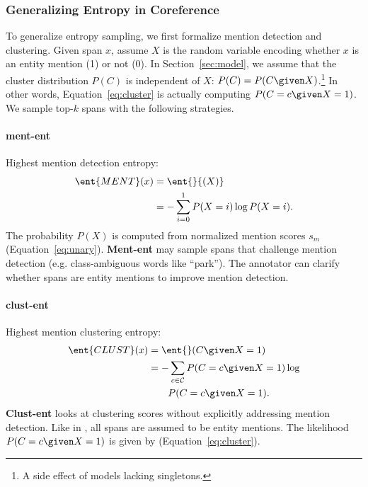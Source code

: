 \subsubsection{Generalizing Entropy in Coreference}
\label{ssec:entropy}

To generalize entropy sampling, we first formalize mention
detection and clustering. Given span $x$, assume $X$ is the random
variable encoding whether
$x$ is an entity mention (1) or not (0).
In Section~\ref{sec:model}, we assume that the cluster distribution
$P(C)$ is independent
of $X$: $P(C) = P(C \given X)$.\footnote{A side effect of \ontonotes{}
  models lacking singletons.} In other words, Equation~\ref{eq:cluster} is actually computing $P(C=c \given X=1)$.
We sample top-$k$ spans with the following strategies.

\paragraph{ment-ent} Highest mention detection entropy:
\begin{align}
    \ent{MENT}(x)
        &= \ent{}{(X)} \\
        &= - \sum_{i=0}^1 P(X=i) \log P(X=i). \nonumber
\end{align}
The probability $P(X)$ is
computed from normalized mention scores $s_m$ (Equation~\ref{eq:unary}).
\textbf{Ment-ent} may sample spans that challenge mention detection (e.g.
class-ambiguous words like ``park'').
The annotator can clarify whether spans are entity mentions to improve mention
detection.

\paragraph{clust-ent} Highest mention clustering entropy:
\begin{align}
    \ent{CLUST}(x)
        &= \ent{}(C \given X = 1) \\
        &= -\sum_{c \in \mathcal{C}} P(C = c \given X =
    1) \log \nonumber \\
    & \qquad P(C = c \given X = 1). \nonumber
\end{align}
\textbf{Clust-ent} looks at clustering scores
without explicitly addressing mention detection.
Like in \ontonotes{}, all spans are assumed to be entity mentions.
The likelihood $P(C =c \given X = 1)$ is given by \icoref{}
(Equation~\ref{eq:cluster}).

